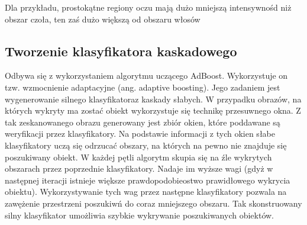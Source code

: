 Dla przykładu, prostokątne regiony oczu mają dużo mniejszą intensywnośd niż obszar czoła, ten zaś dużo większą od obszaru włosów 

\subsection{Tworzenie klasyfikatora kaskadowego}
Odbywa się z wykorzystaniem algorytmu uczącego AdBoost. Wykorzystuje on tzw. wzmocnienie adaptacyjne (ang. adaptive boosting). Jego
zadaniem jest wygenerowanie silnego klasyfikatoraz kaskady słabych. W przypadku obrazów, na których wykryty ma zostać obiekt wykorzystuje się technikę przesuwnego okna. Z tak zeskanowanego obrazu generowany jest zbiór okien, które poddawane są weryfikacji przez klasyfikatory. Na podstawie informacji z tych okien słabe klasyfikatory uczą się odrzucać obszary, na których na pewno nie znajduje się poszukiwany obiekt. W każdej pętli algorytm skupia się na źle wykrytych obszarach przez poprzednie klasyfikatory. Nadaje im wyższe wagi (gdyż w następnej iteracji istnieje większe prawdopodobieostwo prawidłowego wykrycia obiektu). Wykorzystywanie tych wag przez następne klasyfikatory pozwala na zawężenie przestrzeni poszukiwń do coraz mniejszego obszaru. Tak skonstruowany silny klasyfikator umożliwia szybkie wykrywanie poszukiwanych obiektów.
